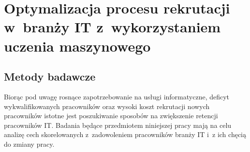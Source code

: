 

\chapter{Optymalizacja procesu rekrutacji w~branży IT z~wykorzystaniem uczenia maszynowego}\label{ch:analysis}


\section{Metody badawcze}\label{sec:analysis-method}
Biorąc pod uwagę rosnące zapotrzebowanie na usługi informatyczne, deficyt wykwalifikowanych pracowników \cite{daxx-2021} oraz wysoki koszt rekrutacji nowych pracowników \cite{hairing-dev-2021} istotne jest poszukiwanie sposobów na zwiększenie retencji pracowników IT.
Badania będące przedmiotem niniejszej pracy mają na celu analizę cech skorelowanych z~zadowoleniem pracowników branży IT i~z ich chęcią do zmiany pracy.
%
%

